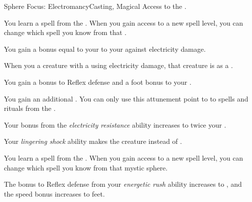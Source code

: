     \begin{feat}{Sphere Focus: Electromancy}{Casting, Magical}
        \featpre Access to the  .

         You learn a spell from the  .
        When you gain access to a new spell level, you can change which spell you know from that .

         You gain a bonus equal to your  to your  against electricity damage.

         When you  a creature with a  using electricity damage, that creature is  as a .

         You gain a  bonus to Reflex defense and a  foot bonus to your .

         You gain an additional .
        You can only use this attunement point to  to spells and rituals from the  .

         Your bonus from the \textit{electricity resistance} ability increases to twice your .

         Your \textit{lingering shock} ability makes the creature  instead of .

         You learn a spell from the  .
        When you gain access to a new spell level, you can change which spell you know from that mystic sphere.

         The bonus to Reflex defense from your \textit{energetic rush} ability increases to , and the speed bonus increases to  feet.
    \end{feat}

